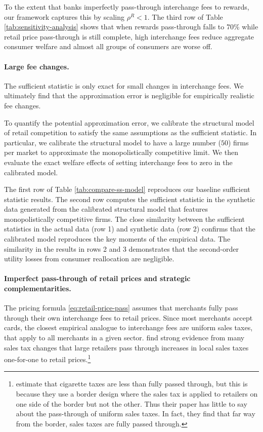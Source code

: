 \documentclass[main.tex]{subfiles}
\begin{document}
To the extent that banks imperfectly pass-through interchange fees to rewards, our framework captures this by scaling $\rho^R<1$. The third row of Table \ref{tab:sensitivity-analysis} shows that when rewards pass-through falls to 70\% while retail price pass-through is still complete, high interchange fees reduce aggregate consumer welfare and almost all groups of consumers are worse off.

\paragraph{Large fee changes.}
The sufficient statistic is only exact for small changes in interchange fees.
We ultimately find that the approximation error is negligible for empirically realistic fee changes.

To quantify the potential approximation error, we calibrate the structural model of retail competition to satisfy the same assumptions as the sufficient statistic. 
In particular, we calibrate the structural model to have a large number ($50$) firms per market to approximate the monopolistically competitive limit.
We then evaluate the exact welfare effects of setting interchange fees to zero in the calibrated model.

The first row of Table \ref{tab:compare-ss-model} reproduces our baseline sufficient statistic results.
The second row computes the sufficient statistic in the synthetic data generated from the calibrated structural model that features monopolistically competitive firms.
The close similarity between the sufficient statistics in the actual data (row 1) and synthetic data (row 2) confirms that the calibrated model reproduces the key moments of the empirical data.
The similarity in the results in rows 2 and 3 demonstrates that the second-order utility losses from consumer reallocation are negligible.

\paragraph{Imperfect pass-through of retail prices and strategic complementarities.}
The pricing formula \ref{eq:retail-price-pass} assumes that merchants fully pass through their own interchange fees to retail prices.
Since most merchants accept cards, the closest empirical analogue to interchange fees are uniform sales taxes, that apply to all merchants in a given sector.
\citet{Butters.etal2022} find strong evidence from many sales tax changes that large retailers pass through increases in local sales taxes one-for-one to retail prices.\footnote{
    \citet{Harding.etal2012} estimate that cigarette taxes are less than fully passed through, but this is because they use a border design where the sales tax is applied to retailers on one side of the border but not the other. Thus their paper has little to say about the pass-through of uniform sales taxes. In fact, they find that far way from the border, sales taxes are fully passed through. 
}
\end{document}

